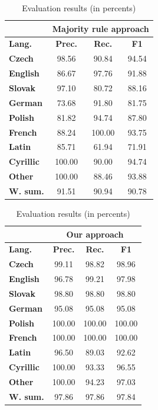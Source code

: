 \documentclass{acm_proc_article-sp}
\begin{document}
{\begin{table}[]
 \centering
 \caption{Evaluation results (in percents)}
 \label{evalres}
 \vspace{0.2cm}
 \begin{tabular}{l||c|c|c|}
       &
     \multicolumn{3}{|c}{\textbf{Majority rule approach}} \\ \hline
     \textbf{Lang.}    & \textbf{Prec.}  & \textbf{Rec.}   & \textbf{F1}  \\ \hline
     \textbf{Czech}    & 98.56  & 90.84  & 94.54 \\
     \textbf{English}  & 86.67  & 97.76  & 91.88 \\
     \textbf{Slovak}   & 97.10  & 80.72  & 88.16 \\
     \textbf{German}   & 73.68  & 91.80  & 81.75 \\
     \textbf{Polish}   & 81.82  & 94.74  & 87.80 \\
     \textbf{French}   & 88.24  & 100.00 & 93.75 \\ \hline
     \textbf{Latin}    & 85.71  & 61.94  & 71.91 \\
     \textbf{Cyrillic} & 100.00 & 90.00  & 94.74 \\
     \textbf{Other}    & 100.00 & 88.46  & 93.88 \\ \hline \hline
     \textbf{W. sum.}  & 91.51  & 90.94  & 90.78 \\
 \end{tabular}
 \end{table}


 \begin{table}[]
 \centering
 \caption{Evaluation results (in percents)}
 \label{evalres}
 \vspace{0.2cm}
 \begin{tabular}{l||c|c|c|}
       &
     \multicolumn{3}{|c}{\textbf{Our approach}} \\ \hline
     \textbf{Lang.}    & \textbf{Prec.}  & \textbf{Rec.}   & \textbf{F1} \\ \hline
     \textbf{Czech}    & 99.11  & 98.82  & 98.96  \\
     \textbf{English}  & 96.78  & 99.21  & 97.98  \\
     \textbf{Slovak}   & 98.80  & 98.80  & 98.80  \\
     \textbf{German}   & 95.08  & 95.08  & 95.08  \\
     \textbf{Polish}   & 100.00 & 100.00 & 100.00 \\
     \textbf{French}   & 100.00 & 100.00 & 100.00 \\ \hline
     \textbf{Latin}    & 96.50  & 89.03  & 92.62  \\
     \textbf{Cyrillic} & 100.00 & 93.33  & 96.55  \\
     \textbf{Other}    & 100.00 & 94.23  & 97.03  \\ \hline \hline
     \textbf{W. sum.}  & 97.86  & 97.86  & 97.84  \\
 \end{tabular}
 \end{table}

}
\end{document}
